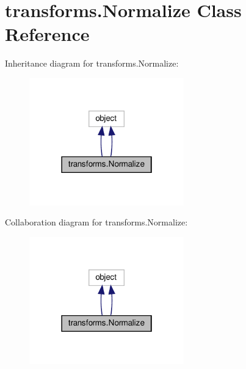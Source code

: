 \hypertarget{classtransforms_1_1Normalize}{}\section{transforms.\+Normalize Class Reference}
\label{classtransforms_1_1Normalize}


Inheritance diagram for transforms.\+Normalize\+:
\nopagebreak
\begin{figure}[H]
\begin{center}
\leavevmode
\includegraphics[width=190pt]{classtransforms_1_1Normalize__inherit__graph}
\end{center}
\end{figure}


Collaboration diagram for transforms.\+Normalize\+:
\nopagebreak
\begin{figure}[H]
\begin{center}
\leavevmode
\includegraphics[width=190pt]{classtransforms_1_1Normalize__coll__graph}
\end{center}
\end{figure}
